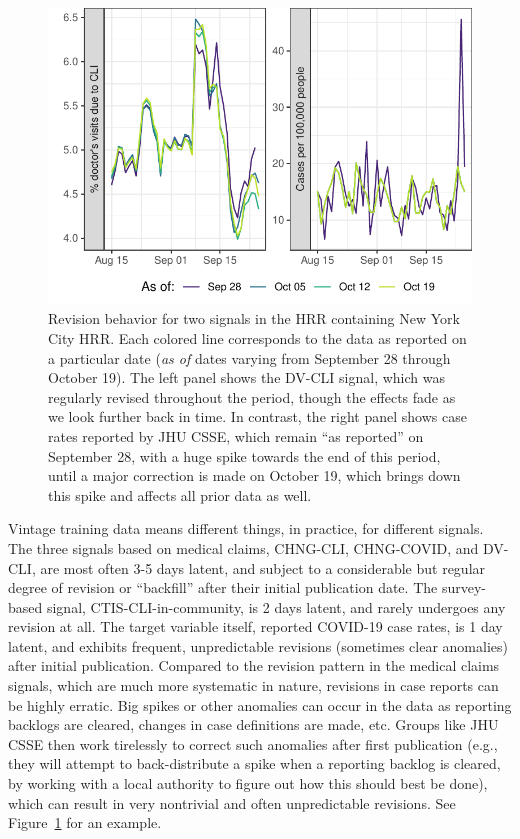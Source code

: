 \documentclass[9pt,twocolumn,twoside,lineno]{pnas-new}
\begin{document}
\begin{figure}[tb!]
  \includegraphics[width=\columnwidth]{fig/revisions.pdf}
  \caption{Revision behavior for two signals in the HRR containing New York City
    HRR.  Each colored line corresponds to the data as reported on a particular
    date (\textit{as of} dates varying from September 28 through October
    19). The left panel shows the DV-CLI signal, which was regularly revised
    throughout the period, though the effects fade as we look further back in   
    time. In contrast, the right panel shows case rates reported by JHU CSSE,
    which remain ``as reported'' on September 28, with a huge spike towards the 
    end of this period, until a major correction is made on October 19, which
    brings down this spike and affects all prior data as well.}
  \label{fig:vintage}
\end{figure}

Vintage training data means different things, in practice, for different
signals. The three signals based on medical claims, CHNG-CLI, CHNG-COVID, and
DV-CLI, are most often 3-5 days latent, and subject to a considerable but
regular degree of revision or ``backfill'' after their initial publication date.
The survey-based signal, CTIS-CLI-in-community, is 2 days latent, and rarely
undergoes any revision at all.  The target variable itself, reported COVID-19
case rates, is 1 day latent, and exhibits frequent, unpredictable revisions
(sometimes clear anomalies) after initial publication.  Compared to the revision
pattern in the medical claims signals, which are much more systematic in nature,
revisions in case reports can be highly erratic. Big spikes or other anomalies
can occur in the data as reporting backlogs are cleared, changes in case
definitions are made, etc. Groups like JHU CSSE then work tirelessly to correct
such anomalies after first publication (e.g., they will attempt to
back-distribute a spike when a reporting backlog is cleared, by working with a
local authority to figure out how this should best be done), which can result
in very nontrivial and often unpredictable revisions.  See
Figure~\ref{fig:vintage} for an example. 
\end{document}
